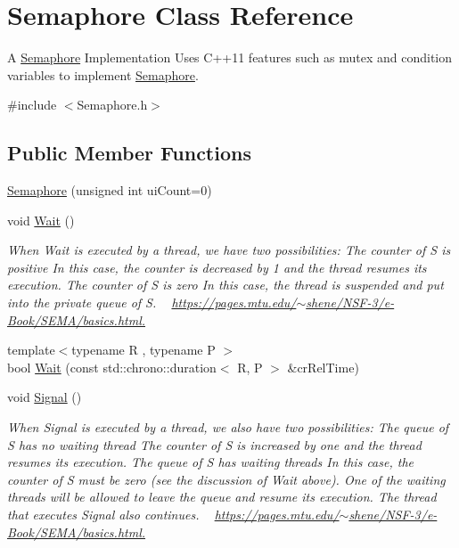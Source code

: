 \hypertarget{class_semaphore}{}\section{Semaphore Class Reference}
\label{class_semaphore}


A \hyperlink{class_semaphore}{Semaphore} Implementation Uses C++11 features such as mutex and condition variables to implement \hyperlink{class_semaphore}{Semaphore}.  




{\ttfamily \#include $<$Semaphore.\+h$>$}

\subsection*{Public Member Functions}
\begin{DoxyCompactItemize}
\item 
\hyperlink{class_semaphore_a0d9290d316636875ca85d1d78950a817}{Semaphore} (unsigned int ui\+Count=0)
\item 
void \hyperlink{class_semaphore_a72aabebf026e3a8b1f3e4d0fa8ee1eda}{Wait} ()
\begin{DoxyCompactList}\small\item\em When Wait is executed by a thread, we have two possibilities\+: The counter of S is positive In this case, the counter is decreased by 1 and the thread resumes its execution. The counter of S is zero In this case, the thread is suspended and put into the private queue of S. ~\newline
\hyperlink{}{https\+://pages.\+mtu.\+edu/$\sim$shene/\+N\+S\+F-\/3/e-\/\+Book/\+S\+E\+M\+A/basics.\+html.}\end{DoxyCompactList}\item 
{\footnotesize template$<$typename R , typename P $>$ }\\bool \hyperlink{class_semaphore_a7f700173ae86ae623684109066e07656}{Wait} (const std\+::chrono\+::duration$<$ R, P $>$ \&cr\+Rel\+Time)
\item 
void \hyperlink{class_semaphore_a86f92f738b4486439b296d8e235895f2}{Signal} ()
\begin{DoxyCompactList}\small\item\em When Signal is executed by a thread, we also have two possibilities\+: The queue of S has no waiting thread The counter of S is increased by one and the thread resumes its execution. The queue of S has waiting threads In this case, the counter of S must be zero (see the discussion of Wait above). One of the waiting threads will be allowed to leave the queue and resume its execution. The thread that executes Signal also continues. ~\newline
\hyperlink{}{https\+://pages.\+mtu.\+edu/$\sim$shene/\+N\+S\+F-\/3/e-\/\+Book/\+S\+E\+M\+A/basics.\+html.}\end{DoxyCompactList}\end{DoxyCompactItemize}


